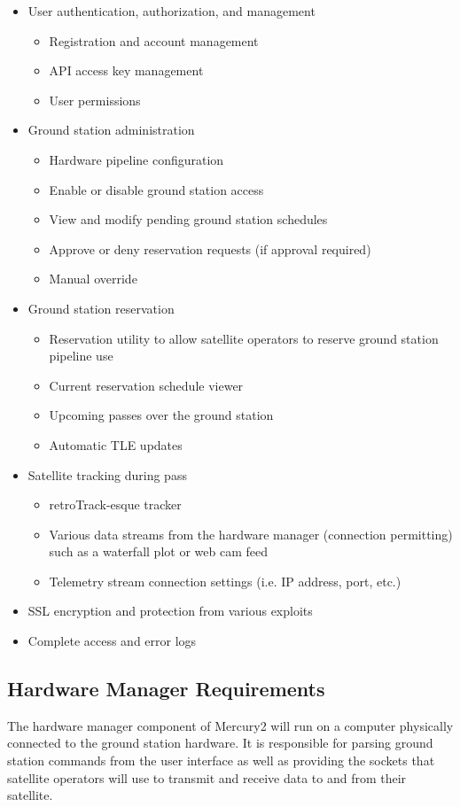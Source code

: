 \documentclass{mxl-design}
\begin{document}
\begin{itemize}
	\item User authentication, authorization, and management
		\begin{itemize}
			\item Registration and account management
			\item API access key management
			\item User permissions
		\end{itemize}
	\item Ground station administration
		\begin{itemize}
			\item Hardware pipeline configuration
			\item Enable or disable ground station access
			\item View and modify pending ground station schedules
			\item Approve or deny reservation requests (if approval required)
			\item Manual override
		\end{itemize}
	\item Ground station reservation
		\begin{itemize}
			\item Reservation utility to allow satellite operators to reserve ground station pipeline use
			\item Current reservation schedule viewer
			\item Upcoming passes over the ground station
			\item Automatic TLE updates
		\end{itemize}
	\item Satellite tracking during pass
		\begin{itemize}
			\item retroTrack-esque tracker
			\item Various data streams from the hardware manager (connection permitting) such as a waterfall plot or web cam feed
			\item Telemetry stream connection settings (i.e. IP address, port, etc.)
		\end{itemize}
	\item SSL encryption and protection from various exploits	
	\item Complete access and error logs
\end{itemize} 

\subsection{Hardware Manager Requirements}
The hardware manager component of Mercury2 will run on a computer physically connected to the ground station hardware. It is responsible for parsing ground station commands from the user interface as well as providing the sockets that satellite operators will use to transmit and receive data to and from their satellite.
\end{document}
